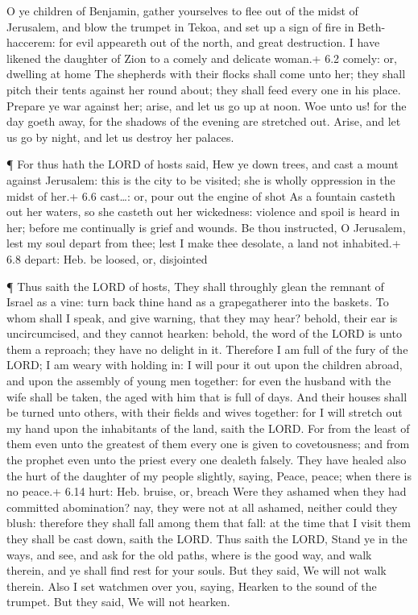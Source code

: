  O ye children of Benjamin, gather yourselves to flee out of
the midst of Jerusalem, and blow the trumpet in Tekoa, and set up a sign
of fire in Beth-haccerem: for evil appeareth out of the north, and great
destruction.  I have likened the daughter of Zion to a
comely and delicate woman.+ 6.2 comely: or, dwelling at home
 The shepherds with their flocks shall come unto her; they
shall pitch their tents against her round about; they shall feed every
one in his place.  Prepare ye war against her; arise, and
let us go up at noon. Woe unto us! for the day goeth away, for the
shadows of the evening are stretched out.  Arise, and let us
go by night, and let us destroy her palaces.

 ¶ For thus hath the LORD of hosts said, Hew ye down trees,
and cast a mount against Jerusalem: this is the city to be visited; she
is wholly oppression in the midst of her.+ 6.6 cast\ldots: or, pour out
the engine of shot  As a fountain casteth out her waters, so
she casteth out her wickedness: violence and spoil is heard in her;
before me continually is grief and wounds.  Be thou
instructed, O Jerusalem, lest my soul depart from thee; lest I make thee
desolate, a land not inhabited.+ 6.8 depart: Heb. be loosed, or,
disjointed

 ¶ Thus saith the LORD of hosts, They shall throughly glean
the remnant of Israel as a vine: turn back thine hand as a grapegatherer
into the baskets.  To whom shall I speak, and give warning,
that they may hear? behold, their ear is uncircumcised, and they cannot
hearken: behold, the word of the LORD is unto them a reproach; they have
no delight in it.  Therefore I am full of the fury of the
LORD; I am weary with holding in: I will pour it out upon the children
abroad, and upon the assembly of young men together: for even the
husband with the wife shall be taken, the aged with him that is full of
days.  And their houses shall be turned unto others, with
their fields and wives together: for I will stretch out my hand upon the
inhabitants of the land, saith the LORD.  For from the
least of them even unto the greatest of them every one is given to
covetousness; and from the prophet even unto the priest every one
dealeth falsely.  They have healed also the hurt of the
daughter of my people slightly, saying, Peace, peace; when there is no
peace.+ 6.14 hurt: Heb. bruise, or, breach  Were they
ashamed when they had committed abomination? nay, they were not at all
ashamed, neither could they blush: therefore they shall fall among them
that fall: at the time that I visit them they shall be cast down, saith
the LORD.  Thus saith the LORD, Stand ye in the ways, and
see, and ask for the old paths, where is the good way, and walk therein,
and ye shall find rest for your souls. But they said, We will not walk
therein.  Also I set watchmen over you, saying, Hearken to
the sound of the trumpet. But they said, We will not hearken.


